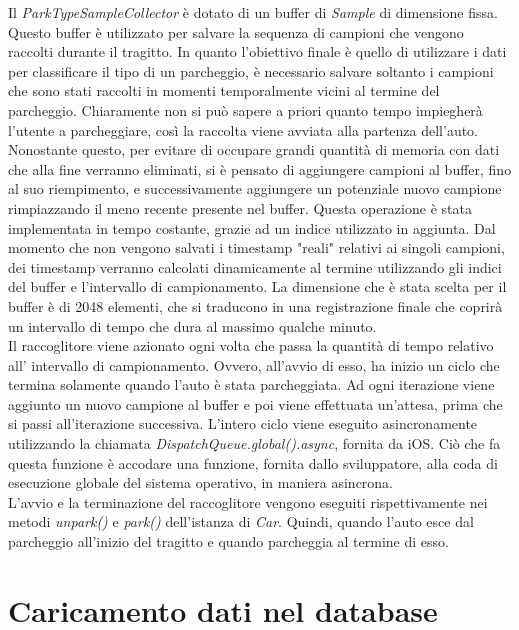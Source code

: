 Il \emph{ParkTypeSampleCollector} è dotato di un buffer di \emph{Sample} di dimensione fissa.
Questo buffer è utilizzato per salvare la sequenza di campioni che vengono raccolti durante
il tragitto. In quanto l'obiettivo finale è quello di utilizzare i dati per classificare 
il tipo di un parcheggio, è necessario salvare soltanto i campioni che sono stati raccolti 
in momenti temporalmente vicini al termine del parcheggio. Chiaramente non si può sapere a 
priori quanto tempo impiegherà l'utente a parcheggiare, così la raccolta viene avviata
alla partenza dell'auto. Nonostante questo, per evitare di occupare grandi quantità di
memoria con dati che alla fine verranno eliminati, si è pensato di aggiungere campioni al
buffer, fino al suo riempimento, e successivamente aggiungere un potenziale nuovo campione 
rimpiazzando il meno recente presente nel buffer. Questa operazione è stata implementata
in tempo costante, grazie ad un indice utilizzato in aggiunta. Dal momento che non vengono
salvati i timestamp "reali" relativi ai singoli campioni, dei timestamp verranno calcolati
dinamicamente al termine utilizzando gli indici del buffer e l'intervallo di campionamento.
La dimensione che è stata scelta per il buffer è di 2048 elementi, che si traducono in una
registrazione finale che coprirà un intervallo di tempo che dura al massimo qualche minuto.\\
Il raccoglitore viene azionato ogni volta che passa la quantità di tempo relativo all'
intervallo di campionamento. Ovvero, all'avvio di esso, ha inizio un ciclo che
termina solamente quando l'auto è stata parcheggiata. Ad ogni iterazione viene aggiunto un
nuovo campione al buffer e poi viene effettuata un'attesa, prima che si passi all'iterazione
successiva. L'intero ciclo viene eseguito asincronamente utilizzando la chiamata
\emph{DispatchQueue.global().async}, fornita da iOS. Ciò che fa questa funzione è
accodare una funzione, fornita dallo sviluppatore, alla coda di esecuzione globale del
sistema operativo, in maniera asincrona.\\
L'avvio e la terminazione del raccoglitore vengono eseguiti rispettivamente nei metodi 
\emph{unpark()} e \emph{park()} dell'istanza di \emph{Car}. Quindi, quando l'auto 
esce dal parcheggio all'inizio del tragitto e quando parcheggia al termine di esso.

\section{Caricamento dati nel database}

